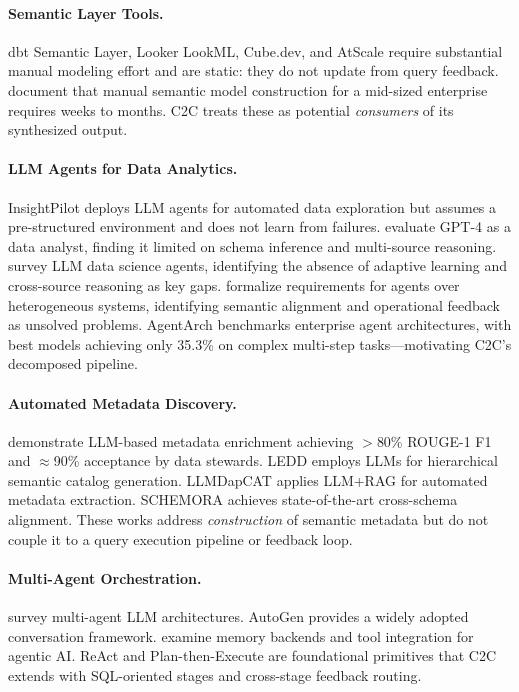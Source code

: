 \documentclass[11pt,a4paper]{article}
\begin{document}
\paragraph{Semantic Layer Tools.}
dbt Semantic Layer, Looker LookML, Cube.dev, and AtScale require substantial
manual modeling effort \citep{abai2024enterprise} and are static: they do not
update from query feedback.  \citet{singh2025llm} document that manual semantic
model construction for a mid-sized enterprise requires weeks to months.  C2C treats
these as potential \emph{consumers} of its synthesized output.

\paragraph{LLM Agents for Data Analytics.}
InsightPilot \citep{ma2023insightpilot} deploys LLM agents for automated data
exploration but assumes a pre-structured environment and does not learn from
failures.  \citet{cheng2023gpt4} evaluate GPT-4 as a data analyst, finding it
limited on schema inference and multi-source reasoning.
\citet{rahman2025llm,chen2025agent} survey LLM data science agents, identifying the
absence of adaptive learning and cross-source reasoning as key gaps.
\citet{zhu2025data} formalize requirements for agents over heterogeneous systems,
identifying semantic alignment and operational feedback as unsolved problems.
AgentArch \citep{bogavelli2025agentarch} benchmarks enterprise agent architectures,
with best models achieving only 35.3\% on complex multi-step tasks---motivating
C2C's decomposed pipeline.

\paragraph{Automated Metadata Discovery.}
\citet{singh2025llm} demonstrate LLM-based metadata enrichment achieving $>$80\%
ROUGE-1 F1 and $\approx$90\% acceptance by data stewards.  LEDD
\citep{an2025ledd} employs LLMs for hierarchical semantic catalog generation.
LLMDapCAT \citep{karim2024llmdapcat} applies LLM+RAG for automated metadata
extraction.  SCHEMORA \citep{gungor2025schemora} achieves state-of-the-art
cross-schema alignment.  These works address \emph{construction} of semantic
metadata but do not couple it to a query execution pipeline or feedback loop.

\paragraph{Multi-Agent Orchestration.}
\citet{adimulam2026multi} survey multi-agent LLM architectures.  AutoGen
\citep{wu2024autogen} provides a widely adopted conversation framework.
\citet{arunkumar2026agentic} examine memory backends and tool integration for
agentic AI.  ReAct \citep{yao2023react} and Plan-then-Execute
\citep{delrosario2025plan} are foundational primitives that C2C extends with
SQL-oriented stages and cross-stage feedback routing.
\end{document}
